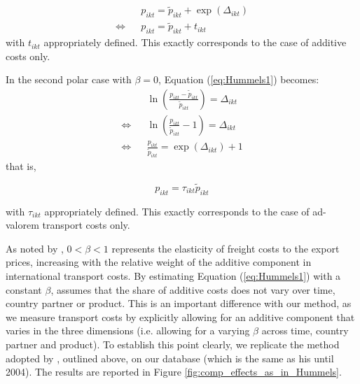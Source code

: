 \documentclass[a4paper,11pt]{article}
\begin{document}
\begin{eqnarray*}
&&p_{ikt} = \widetilde{p}_{ikt} + \exp(\Delta_{ikt})\\
\Leftrightarrow && p_{ikt} = \widetilde{p}_{ikt} + t_{ikt}
\end{eqnarray*}
\noindent with $t_{ikt}$ appropriately defined.
This exactly corresponds to the case of additive costs only.

In the second polar case with $\beta = 0$, Equation (\ref{eq:Hummels1}) becomes:
\begin{eqnarray*}
&&\ln \left(\frac{p_{ikt}- \widetilde{p}_{ikt}}{\widetilde{p}_{ikt}} \right) = \Delta_{ikt} \\
\Leftrightarrow && \ln \left(\frac{p_{ikt}}{\widetilde{p}_{ikt}}-1\right) = \Delta_{ikt}\\
\Leftrightarrow && \frac{p_{ikt}}{\widetilde{p}_{ikt}}  = \exp (\Delta_{ikt})+1
\end{eqnarray*}
\noindent that is,

$$p_{ikt} = \tau_{ikt} \widetilde{p}_{ikt}$$

\noindent with $\tau_{ikt}$ appropriately defined.
This exactly corresponds to the case of ad-valorem transport costs only.


As noted by \cite{hummels_skiba}, $0<\beta<1$ represents the elasticity of freight costs to the export prices, increasing with the relative weight of the additive component in international transport costs.
By estimating Equation (\ref{eq:Hummels1}) with a constant $\beta$, \cite{hummels2007} assumes that the share of additive costs does not vary over time, country partner or product.
This is an important difference with our method, as we measure transport costs by explicitly allowing for an additive component that varies in the three dimensions (i.e. allowing for a varying $\beta$ across time, country partner and product).
To establish this point clearly, we replicate the method adopted by \cite{hummels2007}, outlined above, on our database (which is the same as his until 2004).
The results are reported in Figure \ref{fig:comp_effects_as_in_Hummels}.
\end{document}
